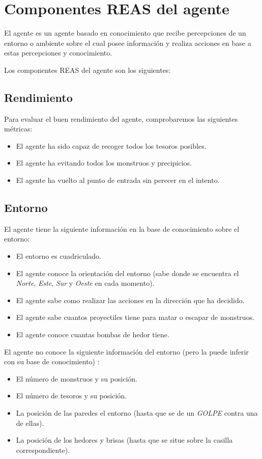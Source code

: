 \section{Componentes REAS del agente}
El agente es un agente basado en conocimiento que recibe percepciones de un entorno o ambiente sobre el cual posee información y realiza acciones en base a estas percepciones y conocimiento.

Los componentes REAS del agente son los siguientes:

\subsection{Rendimiento}

Para evaluar el buen rendimiento del agente, comprobaremos las siguientes métricas:

\begin{itemize}
    \item El agente ha sido capaz de recoger todos los tesoros posibles.
    \item El agente ha evitando todos los monstruos y precipicios.
    \item El agente ha vuelto al punto de entrada sin perecer en el intento.
\end{itemize}

\subsection{Entorno}

El agente tiene la siguiente información en la base de conocimiento sobre el entorno:
\begin{itemize}
    \item El entorno es cuadriculado.
    \item El agente conoce la orientación del entorno (sabe donde se encuentra el \emph{Norte}, \emph{Este}, \emph{Sur} y \emph{Oeste} en cada momento).
    \item El agente sabe como realizar las acciones en la dirección que ha decidido.
    \item El agente sabe cuantos proyectiles tiene para matar o escapar de monstruos.
    \item El agente conoce cuantas bombas de hedor tiene.
\end{itemize}

El agente no conoce la siguiente información del entorno (pero la puede inferir con su base de conocimiento) :
\begin{itemize}
    \item El número de monstruos y su posición.
    \item El número de tesoros y su posición.
    \item La posición de las paredes el entorno (hasta que se de un \emph{GOLPE} contra una de ellas).
    \item La posición de los hedores y brisas (hasta que se situe sobre la casilla correspondiente).
\end{itemize}

